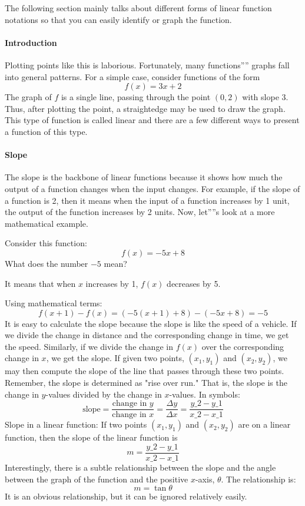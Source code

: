 The following section mainly talks about different forms of linear function notations so that you can easily identify or graph the function.

\paragraph{Introduction}

Plotting points like this is laborious. Fortunately, many functions'''' graphs fall into general patterns. For a simple case, consider functions of the form
$$
f(x) = 3x + 2
$$
The graph of $f$ is a single line, passing through the point $(0,2)$ with slope 3. Thus, after plotting the point, a straightedge may be used to draw the graph. This type of function is called linear and there are a few different ways to present a function of this type.

\paragraph{Slope}

The slope is the backbone of linear functions because it shows how much the output of a function changes when the input changes. For example, if the slope of a function is 2, then it means when the input of a function increases by 1 unit, the output of the function increases by 2 units. Now, let''''s look at a more mathematical example.

Consider this function: 
$$
f(x) = -5x + 8
$$
What does the number $-5$ mean?

It means that when $x$ increases by 1, $f(x)$ decreases by 5.

Using mathematical terms:
$$
f(x+1) - f(x) = (-5(x+1) + 8) - (-5x + 8) = -5
$$
It is easy to calculate the slope because the slope is like the speed of a vehicle. If we divide the change in distance and the corresponding change in time, we get the speed. Similarly, if we divide the change in $f(x)$ over the corresponding change in $x$, we get the slope. If given two points, $(x_1, y_1)$ and $(x_2, y_2)$, we may then compute the slope of the line that passes through these two points. Remember, the slope is determined as "rise over run." That is, the slope is the change in $y$-values divided by the change in $x$-values. In symbols:
$$
\text{slope} = \frac{\text{change in } y}{\text{change in } x} = \frac{\Delta y}{\Delta x} = \frac{y\_2 - y\_1}{x\_2 - x\_1}
$$
Slope in a linear function: If two points $(x_1, y_1)$ and $(x_2, y_2)$ are on a linear function, then the slope of the linear function is
$$
m = \frac{y\_2 - y\_1}{x\_2 - x\_1}
$$
Interestingly, there is a subtle relationship between the slope and the angle between the graph of the function and the positive $x$-axis, $\theta$. The relationship is:
$$
m = \tan \theta
$$
It is an obvious relationship, but it can be ignored relatively easily.

